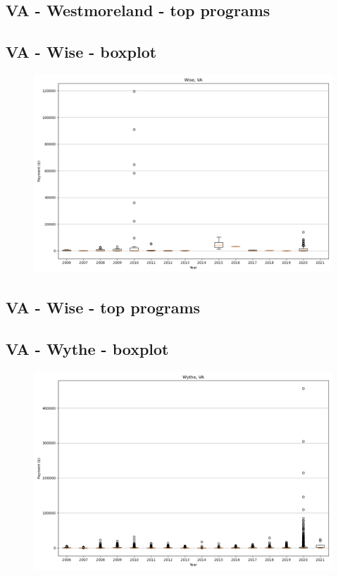 \subsection*{VA - Westmoreland - top programs}

\newpage
\subsection*{VA - Wise - boxplot}
\begin{figure}[h]
\centering
\includegraphics[width=7in]{../output/boxplots/counties/Wise-VA_boxplot.png}
\end{figure}


\subsection*{VA - Wise - top programs}

\newpage
\subsection*{VA - Wythe - boxplot}
\begin{figure}[h]
\centering
\includegraphics[width=7in]{../output/boxplots/counties/Wythe-VA_boxplot.png}
\end{figure}


